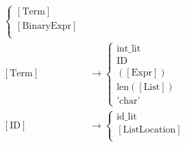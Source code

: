 \documentclass[11pt]{article}
\begin{document}
\begin{align*}
\begin{cases}
  [\text{Term}] \\ 
  [\text{BinaryExpr}] \\
  \end{cases} \\
  [\text{Term}] &\to
  \begin{cases}
    \text{int\_lit} \\ 
    \text{ID} \\ 
    \left([\text{Expr}]\right) \\
    \text{len}\left([\text{List}]\right) \\
    \text{'char'} 
  \end{cases} \\
  [\text{ID}] &\to
  \begin{cases}
    \text{id\_lit} \\
    [\text{ListLocation}] \\
  \end{cases} \\
\end{align*}
\end{document}
